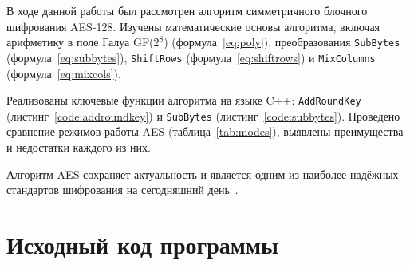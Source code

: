 \documentclass[coursework]{SCWorks}
\begin{document}
\conclusion

В ходе данной работы был рассмотрен алгоритм симметричного блочного шифрования
AES-128. Изучены математические основы алгоритма, включая арифметику в поле
Галуа GF($2^8$) (формула~\eqref{eq:poly}), преобразования \texttt{SubBytes}
(формула~\eqref{eq:subbytes}), \texttt{ShiftRows} (формула~\eqref{eq:shiftrows})
и \texttt{MixColumns} (формула~\eqref{eq:mixcols}).

Реализованы ключевые функции алгоритма на языке C++: \texttt{AddRoundKey}
(листинг~\ref{code:addroundkey}) и \texttt{SubBytes}
(листинг~\ref{code:subbytes}). Проведено сравнение режимов работы AES
(таблица~\ref{tab:modes}), выявлены преимущества и недостатки каждого из них.

Алгоритм AES сохраняет актуальность и является одним из наиболее надёжных
стандартов шифрования на сегодняшний день~\cite{fips197}.




\appendix
\section{Исходный код программы}
\label{app:code}

\begin{listing}[p]
    \caption{Реализация функции \texttt{AddRoundKey}}
    \inputminted{cpp}{code/add_round_key.cpp}
\end{listing}

\begin{listing}[p]
    \caption{Реализация функции \texttt{SubBytes}}
    \inputminted{cpp}{code/sub_bytes.cpp}
\end{listing}
\end{document}

